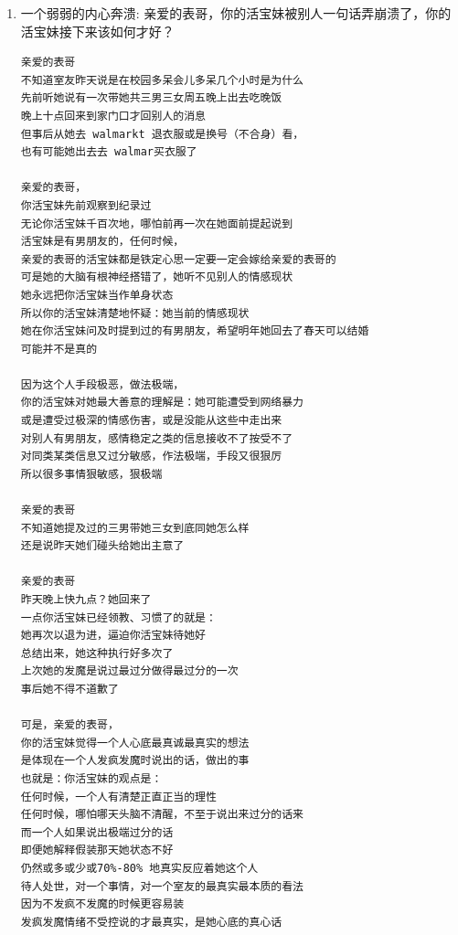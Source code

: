 \documentclass[9pt, b5paper]{article}
\begin{document}
\begin{enumerate}
\begin{verbatim}
今天她中午也回去了
一两点钟别人休息的时候她跑去厨房炸山炸厨房
会去买木条塞门下把门堵住
经不始她如此恶毒地故意打扰破坏别人的学习休息

知道她在家，感觉不太舒服
午休完就回学校了
带的有吃的，晚上会晚点儿十点回家

爱表哥，爱生活！！！
活宝妹就是一定要嫁给亲爱的表哥
爱表哥，爱生活！！！


亲爱的表哥，
她到目前为止，还没有任何收手或是停止的迹象
她或是怕谎言被证实，或是又一次地过敏
她的这种瞬间改变，如同上次水壶坏掉
她瞬间就改变成主要，最主要喝冷水了
只是这次活宝妹有前科之荐，知道她随时变换操作手法
不知道她会不会变本加厉
活宝妹会小心

爱表哥，爱生活！！！
活宝妹就是一定要嫁给亲爱的表哥
爱表哥，爱生活！！！
\end{verbatim}

\item 一个弱弱的内心奔溃: 亲爱的表哥，你的活宝妹被别人一句话弄崩溃了，你的活宝妹接下来该如何才好？
\label{sec-3-2-3-8}
\begin{verbatim}
亲爱的表哥
不知道室友昨天说是在校园多呆会儿多呆几个小时是为什么
先前听她说有一次带她共三男三女周五晚上出去吃晚饭
晚上十点回来到家门口才回别人的消息 
但事后从她去 walmarkt 退衣服或是换号（不合身）看，
也有可能她出去去 walmar买衣服了

亲爱的表哥，
你活宝妹先前观察到纪录过
无论你活宝妹千百次地，哪怕前再一次在她面前提起说到
活宝妹是有男朋友的，任何时候，
亲爱的表哥的活宝妹都是铁定心思一定要一定会嫁给亲爱的表哥的
可是她的大脑有根神经搭错了，她听不见别人的情感现状
她永远把你活宝妹当作单身状态
所以你的活宝妹清楚地怀疑：她当前的情感现状
她在你活宝妹问及时提到过的有男朋友，希望明年她回去了春天可以结婚
可能并不是真的

因为这个人手段极恶，做法极端，
你的活宝妹对她最大善意的理解是：她可能遭受到网络暴力
或是遭受过极深的情感伤害，或是没能从这些中走出来
对别人有男朋友，感情稳定之类的信息接收不了按受不了
对同类某类信息又过分敏感，作法极端，手段又很狠厉
所以很多事情狠敏感，狠极端

亲爱的表哥
不知道她提及过的三男带她三女到底同她怎么样
还是说昨天她们碰头给她出主意了

亲爱的表哥 
昨天晚上快九点？她回来了
一点你活宝妹已经领教、习惯了的就是：
她再次以退为进，逼迫你活宝妹待她好
总结出来，她这种执行好多次了
上次她的发魔是说过最过分做得最过分的一次
事后她不得不道歉了

可是，亲爱的表哥，
你的活宝妹觉得一个人心底最真诚最真实的想法
是体现在一个人发疯发魔时说出的话，做出的事
也就是：你活宝妹的观点是：
任何时候，一个人有清楚正直正当的理性
任何时候，哪怕哪天头脑不清醒，不至于说出来过分的话来
而一个人如果说出极端过分的话
即便她解释假装那天她状态不好
仍然或多或少或70%-80% 地真实反应着她这个人
待人处世，对一个事情，对一个室友的最真实最本质的看法
因为不发疯不发魔的时候更容易装
发疯发魔情绪不受控说的才最真实，是她心底的真心话


\end{verbatim}
\end{enumerate}
\end{document}
